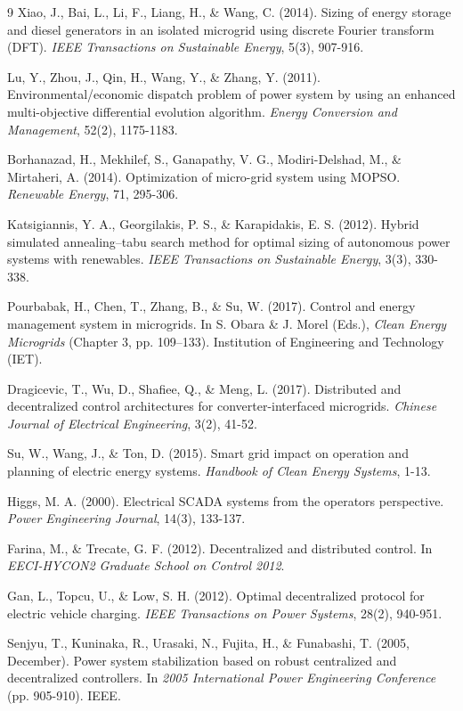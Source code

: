 \documentclass[final,3p,times]{elsarticle}
\begin{document}
\begin{thebibliography}{9}
Xiao, J., Bai, L., Li, F., Liang, H., \& Wang, C. (2014). Sizing of energy storage and diesel generators in an isolated microgrid using discrete Fourier transform (DFT). \textit{IEEE Transactions on Sustainable Energy}, 5(3), 907-916.

Lu, Y., Zhou, J., Qin, H., Wang, Y., \& Zhang, Y. (2011). Environmental/economic dispatch problem of power system by using an enhanced multi-objective differential evolution algorithm. \textit{Energy Conversion and Management}, 52(2), 1175-1183.

Borhanazad, H., Mekhilef, S., Ganapathy, V. G., Modiri-Delshad, M., \& Mirtaheri, A. (2014). Optimization of micro-grid system using MOPSO. \textit{Renewable Energy}, 71, 295-306.

Katsigiannis, Y. A., Georgilakis, P. S., \& Karapidakis, E. S. (2012). Hybrid simulated annealing–tabu search method for optimal sizing of autonomous power systems with renewables. \textit{IEEE Transactions on Sustainable Energy}, 3(3), 330-338.

Pourbabak, H., Chen, T., Zhang, B., \& Su, W. (2017). Control and energy management system in microgrids. In S. Obara \& J. Morel (Eds.), \textit{Clean Energy Microgrids} (Chapter 3, pp. 109--133). Institution of Engineering and Technology (IET).

Dragicevic, T., Wu, D., Shafiee, Q., \& Meng, L. (2017). Distributed and decentralized control architectures for converter-interfaced microgrids. \textit{Chinese Journal of Electrical Engineering}, 3(2), 41-52.

Su, W., Wang, J., \& Ton, D. (2015). Smart grid impact on operation and planning of electric energy systems. \textit{Handbook of Clean Energy Systems}, 1-13.

Higgs, M. A. (2000). Electrical SCADA systems from the operators perspective. \textit{Power Engineering Journal}, 14(3), 133-137.

Farina, M., \& Trecate, G. F. (2012). Decentralized and distributed control. In \textit{EECI-HYCON2 Graduate School on Control 2012}.

Gan, L., Topcu, U., \& Low, S. H. (2012). Optimal decentralized protocol for electric vehicle charging. \textit{IEEE Transactions on Power Systems}, 28(2), 940-951.

Senjyu, T., Kuninaka, R., Urasaki, N., Fujita, H., \& Funabashi, T. (2005, December). Power system stabilization based on robust centralized and decentralized controllers. In \textit{2005 International Power Engineering Conference} (pp. 905-910). IEEE.


\end{thebibliography}
\end{document}
